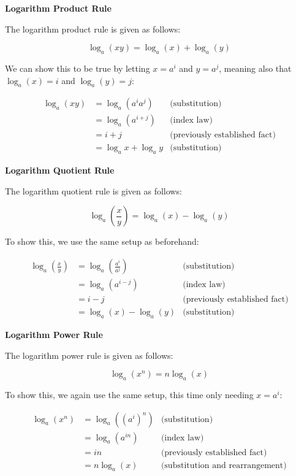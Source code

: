 \documentclass[12pt]{article}
\begin{document}
\noindent\textbf{Logarithm Product Rule}

\noindent The logarithm product rule is given as follows:

\[
\log_a(xy) = \log_a(x) + \log_a(y)
\]

\noindent We can show this to be true by letting \( x = a^i \) and \( y = a^j \), meaning also that \( \log_a(x) = i \) and \( \log_a(y) = j \):

\begin{align*}
\log_a(xy) &= \log_a(a^i a^j) & \text{(substitution)} \\
           &= \log_a(a^{i+j}) & \text{(index law)} \\
           &= i + j & \text{(previously established fact)} \\
           &= \log_a x + \log_a y & \text{(substitution)}
\end{align*}

\noindent\textbf{Logarithm Quotient Rule}

\noindent The logarithm quotient rule is given as follows:

\[
\log_a\left(\frac{x}{y}\right) = \log_a(x) - \log_a(y)
\]

\noindent To show this, we use the same setup as beforehand:

\begin{align*}
\log_a\left(\frac{x}{y}\right) &= \log_a\left(\frac{a^i}{a^j}\right) & \text{(substitution)} \\
                               &= \log_a(a^{i-j}) & \text{(index law)} \\
                               &= i - j & \text{(previously established fact)} \\
                               &= \log_a(x) - \log_a(y) & \text{(substitution)}
\end{align*}

\noindent\textbf{Logarithm Power Rule}

\noindent The logarithm power rule is given as follows:

\[
\log_a(x^n) = n\log_a(x)
\]

\noindent To show this, we again use the same setup, this time only needing \( x = a^i \):

\begin{align*}
\log_a(x^n) &= \log_a\left((a^i)^n\right) & \text{(substitution)} \\
            &= \log_a(a^{in}) & \text{(index law)} \\
            &= in & \text{(previously established fact)} \\
            &= n\log_a(x) & \text{(substitution and rearrangement)}
\end{align*}
\end{document}

